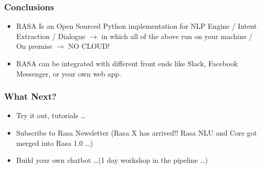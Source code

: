 \begin{frame}\frametitle{Conclusions}
\begin{itemize}
\item RASA Is an Open Sourced Python implementation for NLP Engine / Intent Extraction / Dialogue $\rightarrow$ in which all of the above run on your machine / On premise $\rightarrow$ NO CLOUD!
\item RASA can be integrated with different front ends like Slack, Facebook Messenger, or your own web app.
\end{itemize}
\end{frame}

\begin{frame}\frametitle{What Next?}
\begin{itemize}
\item Try it out, tutorials \ldots
\item Subscribe to Rasa Newsletter (Rasa X has arrived!! Rasa NLU and Core got merged into Rasa 1.0 \ldots)
\item Build your own chatbot \ldots (1 day workshop in the pipeline \ldots)
\end{itemize}
\end{frame}
